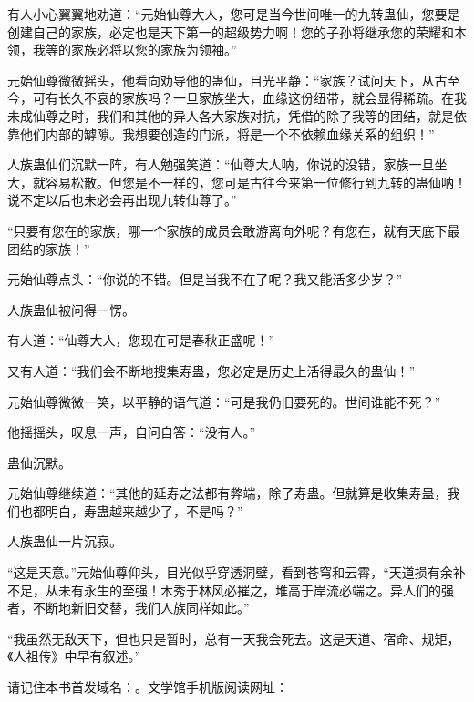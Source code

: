 \begin{this_body}
有人小心翼翼地劝道：“元始仙尊大人，您可是当今世间唯一的九转蛊仙，您要是创建自己的家族，必定也是天下第一的超级势力啊！您的子孙将继承您的荣耀和本领，我等的家族必将以您的家族为领袖。”

元始仙尊微微摇头，他看向劝导他的蛊仙，目光平静：“家族？试问天下，从古至今，可有长久不衰的家族吗？一旦家族坐大，血缘这份纽带，就会显得稀疏。在我未成仙尊之时，我们和其他的异人各大家族对抗，凭借的除了我等的团结，就是依靠他们内部的罅隙。我想要创造的门派，将是一个不依赖血缘关系的组织！”

人族蛊仙们沉默一阵，有人勉强笑道：“仙尊大人呐，你说的没错，家族一旦坐大，就容易松散。但您是不一样的，您可是古往今来第一位修行到九转的蛊仙呐！说不定以后也未必会再出现九转仙尊了。”

“只要有您在的家族，哪一个家族的成员会敢游离向外呢？有您在，就有天底下最团结的家族！”

元始仙尊点头：“你说的不错。但是当我不在了呢？我又能活多少岁？”

人族蛊仙被问得一愣。

有人道：“仙尊大人，您现在可是春秋正盛呢！”

又有人道：“我们会不断地搜集寿蛊，您必定是历史上活得最久的蛊仙！”

元始仙尊微微一笑，以平静的语气道：“可是我仍旧要死的。世间谁能不死？”

他摇摇头，叹息一声，自问自答：“没有人。”

蛊仙沉默。

元始仙尊继续道：“其他的延寿之法都有弊端，除了寿蛊。但就算是收集寿蛊，我们也都明白，寿蛊越来越少了，不是吗？”

人族蛊仙一片沉寂。

“这是天意。”元始仙尊仰头，目光似乎穿透洞壁，看到苍穹和云霄，“天道损有余补不足，从未有永生的至强！木秀于林风必摧之，堆高于岸流必端之。异人们的强者，不断地新旧交替，我们人族同样如此。”

“我虽然无敌天下，但也只是暂时，总有一天我会死去。这是天道、宿命、规矩，《人祖传》中早有叙述。”

请记住本书首发域名：。文学馆手机版阅读网址：

\end{this_body}

